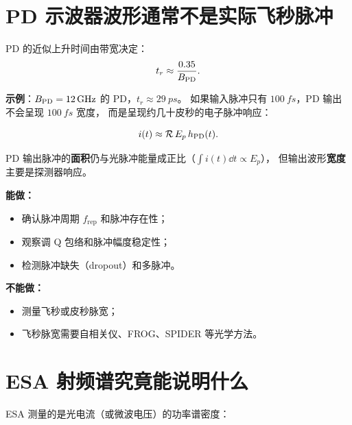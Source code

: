 \documentclass[11pt,a4paper]{article}
\newcommand{\rep}{f_{\text{rep}}}
\newcommand{\pdresp}{\mathcal{R}}
\begin{document}
\section{PD 示波器波形通常不是实际飞秒脉冲}

PD 的近似上升时间由带宽决定：
\begin{equation}\label{eq:pd_risetime}
t_r \approx \frac{0.35}{B_{\rm PD}}.
\end{equation}

\textbf{示例}：$B_{\rm PD} = \SI{12}{GHz}$ 的 PD，$t_r \approx \SI{29}{ps}$。
如果输入脉冲只有 $\SI{100}{fs}$，PD 输出不会呈现 $\SI{100}{fs}$ 宽度，
而是呈现约几十皮秒的电子脉冲响应：

\begin{equation}\label{eq:pd_output_fs}
i(t) \approx \pdresp\,E_p\,h_{\rm PD}(t).
\end{equation}

PD 输出脉冲的\textbf{面积}仍与光脉冲能量成正比（$\int i(t)\dd{t} \propto E_p$），
但输出波形\textbf{宽度}主要是探测器响应。

\begin{tcolorbox}[width=0.92\textwidth, colback=orange!3, colframe=orange!60,
    title=PD + 示波器能/不能做什么]
\textbf{能做：}
\begin{itemize}
    \item 确认脉冲周期 $\rep$ 和脉冲存在性；
    \item 观察调 Q 包络和脉冲幅度稳定性；
    \item 检测脉冲缺失（dropout）和多脉冲。
\end{itemize}
\textbf{不能做：}
\begin{itemize}
    \item 测量飞秒或皮秒脉宽；
    \item 飞秒脉宽需要自相关仪、FROG、SPIDER 等光学方法。
\end{itemize}
\end{tcolorbox}

\section{ESA 射频谱究竟能说明什么}

ESA 测量的是光电流（或微波电压）的功率谱密度：
\end{document}
